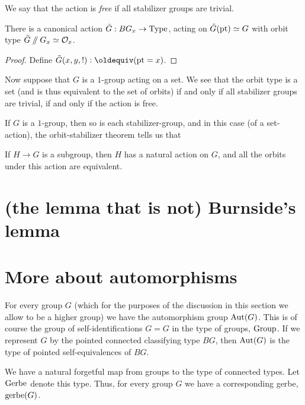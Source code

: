 We say that the action is \emph{free} if all stabilizer groups are trivial.

\begin{theorem}
  There is a canonical action $\tilde G : BG_x \to \mathord{\mathrm{Type}}$,
  acting on $\tilde G({\mathord{\mathrm{pt}}})\simeq G$
  with orbit type $\tilde G\mathbin{/\kern-3pt/} G_x \simeq \mathcal O_x$.
\end{theorem}
\begin{proof}
  Define $\tilde G(x,y,!) \defeq (\pt = x)$.
\end{proof}

Now suppose that $G$ is a $1$-group acting on a set.
We see that the orbit type is a set
(and is thus equivalent to the set of orbits)
if and only if
all stabilizer groups are trivial,
\ie if and only if the action is free.

If $G$ is a $1$-group,
then so is each stabilizer-group,
and in this case (of a set-action),
the orbit-stabilizer theorem
tells us that 

\begin{theorem}
  If $H \to G$ is a subgroup, then $H$ has a natural action on $G$,
  and all the orbits under this action are equivalent.
\end{theorem}

\section{(the lemma that is not) Burnside's lemma}
\label{sec:burnsides-lemma}

\section{More about automorphisms}
\label{sec:automorphisms}

For every group $G$ (which for the purposes of the discussion
in this section we allow to be a higher group)
we have the automorphism group $\operatorname{Aut}(G)$.
This is of course the group of self-identifications $G = G$ in the type of groups, $\mathord{\mathrm{Group}}$.
If we represent $G$ by the pointed connected classifying type $BG$,
then $\operatorname{Aut}(G)$ is the type of pointed self-equivalences of $BG$.

We have a natural forgetful map from groups to the type of connected types.
Let $\mathord{\mathrm{Gerbe}}$ denote this type.
Thus, for every group $G$ we have a corresponding gerbe, $\operatorname{gerbe}(G)$.

